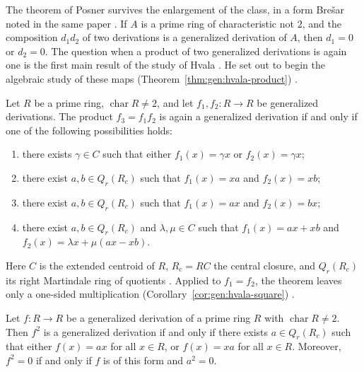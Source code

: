 The theorem of Posner survives the enlargement of the class, in a form Brešar
noted in the same paper \cite[Remark~3, pp.~90--91]{Bresar1991Glasgow}.
If $A$ is a prime ring of characteristic not $2$, and the composition $d_{1}d_{2}$
of two derivations is a generalized derivation of $A$, then $d_{1}=0$ or
$d_{2}=0$.
The question when a product of two generalized derivations
is again one is the first main result of the study of Hvala
\cite[p.~1]{Hvala1998}.
He set out to begin the algebraic study of these maps (Theorem~\ref{thm:gen:hvala-product})
\cite[p.~1147]{Hvala1998}.\begin{theorem}\label{thm:gen:hvala-product}
Let $R$ be a prime ring, $\operatorname{char}R\neq 2$, and let
$f_{1},f_{2}\colon R\to R$ be generalized derivations. The product
$f_{3}=f_{1}f_{2}$ is again a generalized derivation if and only if one of
the following possibilities holds:
\begin{enumerate}
\item[(i)] there exists $\gamma\in C$ such that either $f_{1}(x)=\gamma x$ or
$f_{2}(x)=\gamma x$;
\item[(ii)] there exist $a,b\in Q_{r}(R_{c})$ such that $f_{1}(x)=xa$ and
$f_{2}(x)=xb$;
\item[(iii)] there exist $a,b\in Q_{r}(R_{c})$ such that $f_{1}(x)=ax$ and
$f_{2}(x)=bx$;
\item[(iv)] there exist $a,b\in Q_{r}(R_{c})$ and $\lambda,\mu\in C$ such
that $f_{1}(x)=ax+xb$ and $f_{2}(x)=\lambda x+\mu(ax-xb)$.
\end{enumerate}
\end{theorem}

Here $C$ is the extended centroid of $R$, $R_{c}=RC$ the central closure, and
$Q_{r}(R_{c})$ its right Martindale ring of quotients
\cite[p.~1148]{Hvala1998}. Applied to $f_{1}=f_{2}$, the theorem leaves only a
one-sided multiplication (Corollary~\ref{cor:gen:hvala-square})
\cite[Corollary~5, p.~1155]{Hvala1998}.

\begin{corollary}\label{cor:gen:hvala-square}
Let $f\colon R\to R$ be a generalized derivation of a prime ring $R$ with
$\operatorname{char}R\neq 2$. Then $f^{2}$ is a generalized derivation if and
only if there exists $a\in Q_{r}(R_{c})$ such that either $f(x)=ax$ for all
$x\in R$, or $f(x)=xa$ for all $x\in R$. Moreover, $f^{2}=0$ if and only if
$f$ is of this form and $a^{2}=0$.
\end{corollary}

